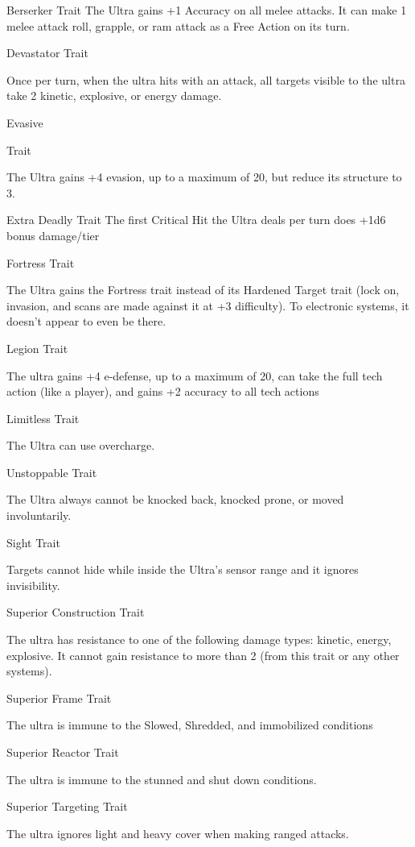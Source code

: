 Berserker
Trait
The Ultra gains +1 Accuracy on all melee attacks. It can make 1 melee attack roll, grapple, or
ram attack as a Free Action on its turn.


Devastator
Trait

Once per turn, when the ultra hits with an attack, all targets visible to the ultra take 2 kinetic,
explosive, or energy damage.


Evasive

Trait

The Ultra gains +4 evasion, up to a maximum of 20, but reduce its structure to 3.


Extra Deadly
Trait
The first Critical Hit the Ultra deals per turn does +1d6 bonus damage/tier


Fortress
Trait

The Ultra gains the Fortress trait instead of its Hardened Target trait (lock on, invasion, and scans
are made against it at +3 difficulty). To electronic systems, it doesn't appear to even be there.


Legion
Trait

The ultra gains +4 e-defense, up to a maximum of 20, can take the full tech action (like a player),
and gains +2 accuracy to all tech actions


Limitless
Trait

The Ultra can use overcharge.


Unstoppable
Trait

The Ultra always cannot be knocked back, knocked prone, or moved involuntarily.


Sight
Trait

Targets cannot hide while inside the Ultra's sensor range and it ignores invisibility.


Superior Construction
Trait

The ultra has resistance to one of the following damage types: kinetic, energy, explosive. It
cannot gain resistance to more than 2 (from this trait or any other systems).





Superior Frame
Trait

The ultra is immune to the Slowed, Shredded, and immobilized conditions


Superior Reactor
Trait

The ultra is immune to the stunned and shut down conditions.


Superior Targeting
Trait

The ultra ignores light and heavy cover when making ranged attacks.


